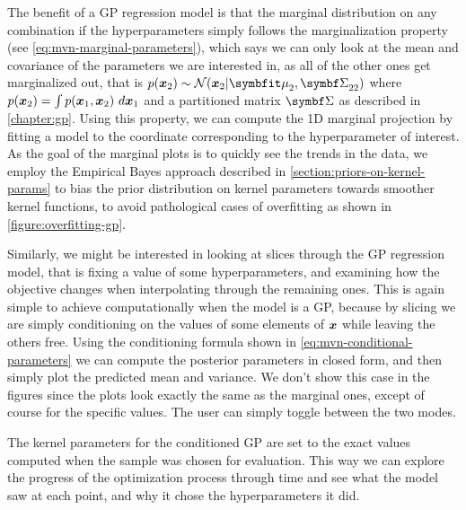 The benefit of a GP regression model is that the marginal distribution on any combination if the hyperparameters simply follows the marginalization property (see \autoref{eq:mvn-marginal-parameters}), which says we can only look at the mean and covariance of the parameters we are interested in, as all of the other ones get marginalized out, that is $p(\vx_2) \sim \mathcal{N}(\vx_2 | \vmu_2, \mSigma_{22})$ where $p({\boldsymbol{x}}_2) = \int p({\boldsymbol{x}}_1, {\boldsymbol{x}}_2)\ d{\boldsymbol{x}}_1$ and a partitioned matrix $\mSigma$ as described in \autoref{chapter:gp}. Using this property, we can compute the 1D marginal projection by fitting a model to the coordinate corresponding to the hyperparameter of interest. As the goal of the marginal plots is to quickly see the trends in the data, we employ the Empirical Bayes approach described in \autoref{section:priors-on-kernel-params} to bias the prior distribution on kernel parameters towards smoother kernel functions, to avoid pathological cases of overfitting as shown in \autoref{figure:overfitting-gp}.

Similarly, we might be interested in looking at slices through the GP regression model, that is fixing a value of some hyperparameters, and examining how the objective changes when interpolating through the remaining ones. This is again simple to achieve computationally when the model is a GP, because by slicing we are simply conditioning on the values of some elements of ${\boldsymbol{x}}$ while leaving the others free. Using the conditioning formula shown in \autoref{eq:mvn-conditional-parameters} we can compute the posterior parameters in closed form, and then simply plot the predicted mean and variance. We don't show this case in the figures since the plots look exactly the same as the marginal ones, except of course for the specific values. The user can simply toggle between the two modes.

The kernel parameters for the conditioned GP are set to the exact values computed when the sample was chosen for evaluation. This way we can explore the progress of the optimization process through time and see what the model saw at each point, and why it chose the hyperparameters it did.

